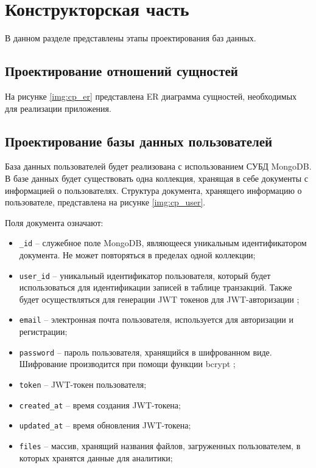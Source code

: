 \chapter{Конструкторская часть}

В данном разделе представлены этапы проектирования баз данных.

\section{Проектирование отношений сущностей}

На рисунке \ref{img:cp_er} представлена ER диаграмма сущностей, необходимых для реализации приложения.


\section{Проектирование базы данных пользователей}

База данных пользователей будет реализована с использованием СУБД MongoDB. В базе данных будет существовать одна коллекция, хранящая в себе документы с информацией о пользователях. Структура документа, хранящего информацию о пользователе, представлена на рисунке \ref{img:cp_user}.


Поля документа означают:

\begin{itemize}
	\item \texttt{\_id} -- служебное поле MongoDB, являющееся уникальным идентификатором документа. Не может повторяться в пределах одной коллекции;
	\item \texttt{user\_id} -- уникальный идентификатор пользователя, который будет использоваться для идентификации записей в таблице транзакций. Также будет осуществляться для генерации JWT токенов для JWT-авторизации \cite{jwt};
	\item \texttt{email} -- электронная почта пользователя, используется для авторизации и регистрации;
	\item \texttt{password} -- пароль пользователя, хранящийся в шифрованном виде. Шифрование производится при помощи функции bcrypt \cite{bcrypt};
	\item \texttt{token} -- JWT-токен пользователя;
	\item \texttt{created\_at} -- время создания JWT-токена;
	\item \texttt{updated\_at} -- время обновления JWT-токена;
	\item \texttt{files} -- массив, хранящий названия файлов, загруженных пользователем, в которых хранятся данные для аналитики;
\end{itemize}

